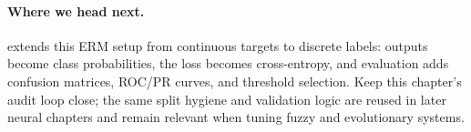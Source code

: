 \medskip
\paragraph{Where we head next.}  extends this ERM setup from continuous targets to discrete labels: outputs become class probabilities, the loss becomes cross\hyp{}entropy, and evaluation adds confusion matrices, ROC/PR curves, and threshold selection. Keep this chapter's audit loop close; the same split hygiene and validation logic are reused in later neural chapters and remain relevant when tuning fuzzy and evolutionary systems.


\FloatBarrier
